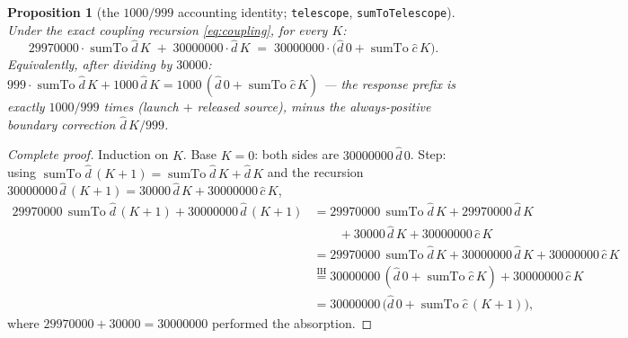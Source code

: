 \documentclass[11pt]{article}
\newcommand{\dhat}{\widehat{d}}
\newcommand{\chat}{\widehat{c}}
\newcommand{\sumto}{\operatorname{sumTo}}
\theoremstyle{plain}
\newtheorem{proposition}[lemma]{Proposition}
\theoremstyle{definition}
\begin{document}
\begin{proposition}[the $1000/999$ accounting identity; \texttt{telescope}, \texttt{sumToTelescope}]\label{prop:telescope}
Under the \emph{exact} coupling recursion \eqref{eq:coupling}, for every $K$:
\begin{equation}\label{eq:telescope}
29970000\cdot\sumto\dhat\,K\;+\;30000000\cdot\dhat\,K
\;=\;30000000\cdot\bigl(\dhat\,0+\sumto\chat\,K\bigr).
\end{equation}
Equivalently, after dividing by $30000$:
$999\cdot\sumto\dhat\,K+1000\,\dhat\,K=1000\,(\dhat\,0+\sumto\chat\,K)$ --- the response
prefix is exactly $1000/999$ times (launch $+$ released source), minus the always-positive
boundary correction $\dhat\,K/999$.
\end{proposition}
\begin{proof}[Complete proof]
Induction on $K$. Base $K=0$: both sides are $30000000\,\dhat\,0$. Step: using
$\sumto\dhat\,(K+1)=\sumto\dhat\,K+\dhat\,K$ and the recursion
$30000000\,\dhat\,(K+1)=30000\,\dhat\,K+30000000\,\chat\,K$,
\begin{align*}
29970000\,\sumto\dhat\,(K+1)+30000000\,\dhat\,(K+1)
&=29970000\,\sumto\dhat\,K+29970000\,\dhat\,K\\
&\qquad+30000\,\dhat\,K+30000000\,\chat\,K\\
&=29970000\,\sumto\dhat\,K+30000000\,\dhat\,K+30000000\,\chat\,K\\
&\overset{\text{IH}}{=}30000000\,(\dhat\,0+\sumto\chat\,K)+30000000\,\chat\,K\\
&=30000000\,\bigl(\dhat\,0+\sumto\chat\,(K+1)\bigr),
\end{align*}
where $29970000+30000=30000000$ performed the absorption.
\end{proof}
\end{document}
